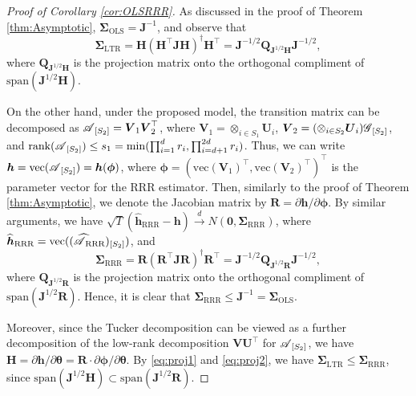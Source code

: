 \documentclass[12pt]{article}
\newcommand{\bm}{\boldsymbol}
\newcommand{\cm}[1]{\mbox{\boldmath$\mathscr{#1}$}}
\begin{document}
%

\begin{proof}[Proof of Corollary \ref{cor:OLSRRR}]
As discussed in the proof of Theorem \ref{thm:Asymptotic}, $\bm{\Sigma}_{\text{OLS}}=\bm{J}^{-1}$, and observe that
\begin{equation}\label{eq:proj1}
\bm{\Sigma}_{\text{LTR}}=\bm{H}(\bm{H}^\top\bm{JH})^\dagger\bm{H}^\top=\bm{J}^{-1/2}\bm{Q}_{\bm{J}^{1/2}\bm{H}}\bm{J}^{-1/2},
\end{equation}
where $\bm{Q}_{\bm{J}^{1/2}\bm{H}}$ is the projection matrix onto the orthogonal compliment of $\text{span}(\bm{J}^{1/2}\bm{H})$. 


On the other hand, under the proposed  model,  the transition matrix can be decomposed as  $\cm{A}_{[S_2]}=\bm{V}_1 \bm{V}_2^\top$, where $\bm{V}_1=\otimes_{i\in S_1}\bm{U}_i$, $\bm{V}_2=(\otimes_{i\in S_2}\bm{U}_i)\cm{G}_{[S_2]}$, and $\text{rank}(\cm{A}_{[S_2]})\leq s_1=\min(\prod_{i=1}^dr_i,\prod_{i=d+1}^{2d}r_i)$. 
Thus, we can write $\bm{h}=\text{vec}(\cm{A}_{[S_2]})=\bm{h}(\bm{\phi})$, where $\bm{\phi}=(\text{vec}(\bm{V}_1)^\top,\text{vec}(\bm{V}_2)^\top)^\top$ is the parameter vector for the  RRR estimator. Then, similarly to the proof of Theorem \ref{thm:Asymptotic},  we denote the Jacobian matrix by $\bm{R}=\partial\bm{h}/\partial\bm{\phi}$.
By similar arguments,  we have
$\sqrt{T}(\bm{\widehat{h}}_{\text{RRR}}-\bm{h})\overset{d}{\to}N(\bm{0},\bm{\Sigma}_{\text{RRR}})$,
where $\bm{\widehat{h}}_{\text{RRR}}=\text{vec}((\cm{\widehat{A}}_{\textup{RRR}})_{[S_2]})$, and
\begin{equation}\label{eq:proj2}
\bm{\Sigma}_{\text{RRR}}=\bm{R}(\bm{R}^\top\bm{JR})^\dagger\bm{R}^\top=\bm{J}^{-1/2}\bm{Q}_{\bm{J}^{1/2}\bm{R}}\bm{J}^{-1/2},
\end{equation}
where $\bm{Q}_{\bm{J}^{1/2}\bm{R}}$ is the projection matrix onto the orthogonal compliment of $\text{span}(\bm{J}^{1/2}\bm{R})$. Hence, it is clear that $\bm{\Sigma}_{\text{RRR}}\leq \bm{J}^{-1}=\bm{\Sigma}_{\text{OLS}}$. 

Moreover, since  the Tucker decomposition can be viewed as a further decomposition of the low-rank decomposition $\bm{VU}^\top$ for $\cm{A}_{[S_2]}$, we have $\bm{H}=\partial\bm{h}/\partial\bm{\theta}=\bm{R} \cdot\partial\bm{\phi}/\partial\bm{\theta}$. By \eqref{eq:proj1} and \eqref{eq:proj2}, we have  $\bm{\Sigma}_{\text{LTR}} \leq \bm{\Sigma}_{\text{RRR}}$, since $\text{span}(\bm{J}^{1/2}\bm{H})\subset\text{span}(\bm{J}^{1/2}\bm{R})$.
\end{proof}
\end{document}
